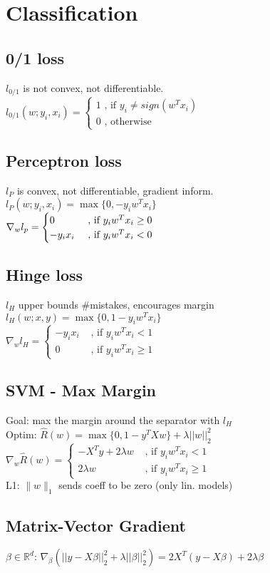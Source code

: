 \section*{\normalsize{Classification}}
\subsection*{0/1 loss}
$l_{0/1}$ is not convex, not differentiable.\\
$l_{0/1} (w;y_i,x_i) =
\begin{cases}
    1 \text{ , if } y_i \neq sign(w^Tx_i)\\
		0 \text{ , otherwise} 
\end{cases}$

\subsection*{Perceptron loss}
$l_P$ is convex, not differentiable, gradient inform.\\
$l_{P} (w;y_i,x_i) = \max \{0, -y_i w^T x_i \}$\\
$\nabla_w l_p = \begin{cases}
    0 &\text{ , if  } y_i w^T x_i \geq 0\\
    -y_i x_i &\text{ , if  } y_i w^T x_i < 0
\end{cases}\\
$

\subsection*{Hinge loss}
$l_H$ upper bounds \#mistakes, encourages margin \\
$l_H(w;x,y) = \max \{0,1-y_i w^T x_i\}$\\
$\nabla_w l_H =
\begin{cases}
   -y_i x_i &\text{ , if  } y_i w^T x_i < 1 \\
   0 & \text{ , if  } y_i w^T x_i \geq 1 
\end{cases}
$


\subsection*{SVM - Max Margin}
Goal: max the margin around the separator with $l_H$\\
Optim: $\hat{R}(w)=\max \{0,1-y^T Xw \} + \lambda ||w||_2^2$\\
$\nabla_w \hat{R}(w) = 
\begin{cases}
    -X^T y+ 2\lambda w & \text{ , if } y_i w^T x_i<1\\
		2\lambda w & \text{ , if } y_i w^T x_i \geq 1
\end{cases}
$\\
L1: $\| w\|_1$ sends coeff to be zero (only lin. models)


\subsection*{Matrix-Vector Gradient}
$\beta \in \mathbb{R}^d$:
$\nabla_\beta ( ||y-X\beta||_2^2 + \lambda ||\beta||_2^2 ) = 2X^T (y-X\beta) + 2\lambda \beta$
